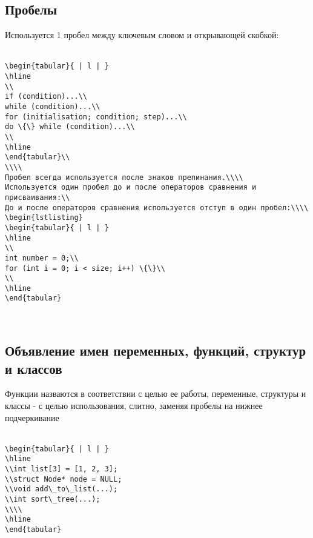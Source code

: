 \documentclass{article}
\begin{document}
\subsection{Пробелы}
Используется 1 пробел между ключевым словом и открывающей скобкой:\\\\
\begin{lstlisting}
\begin{tabular}{ | l | }
\hline
\\
if (condition)...\\
while (condition)...\\
for (initialisation; condition; step)...\\
do \{\} while (condition)...\\
\\
\hline
\end{tabular}\\
\\\\
Пробел всегда используется после знаков препинания.\\\\
Используется один пробел до и после операторов сравнения и присваивания:\\
До и после операторов сравнения используется отступ в один пробел:\\\\
\begin{lstlisting}
\begin{tabular}{ | l | }
\hline
\\
int number = 0;\\
for (int i = 0; i < size; i++) \{\}\\
\\
\hline
\end{tabular}
\end{lstlisting}
\\
\subsection{Объявление имен переменных, функций, структур и классов}
Функции назваются в соответствии с целью ее работы, переменные, структуры и классы - с целью использования, слитно, заменяя пробелы на нижнее подчеркивание\\\\
\begin{lstlisting}
\begin{tabular}{ | l | }
\hline
\\int list[3] = [1, 2, 3];
\\struct Node* node = NULL;
\\void add\_to\_list(...);
\\int sort\_tree(...);
\\\\
\hline
\end{tabular}
\end{lstlisting}
\newpage
\end{document}
